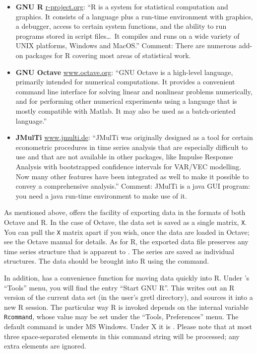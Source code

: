 \begin{itemize}

\item \textbf{GNU R} \href{http://www.r-project.org/}{r-project.org}:
  ``R is a system for statistical computation and graphics. It
  consists of a language plus a run-time environment with graphics, a
  debugger, access to certain system functions, and the ability to run
  programs stored in script files\dots\ It compiles and runs on a wide
  variety of UNIX platforms, Windows and MacOS.''  Comment: There are
  numerous add-on packages for R covering most areas of statistical
  work.

\item \textbf{GNU Octave}
  \href{http://www.octave.org/}{www.octave.org}:
  ``GNU Octave is a high-level language, primarily intended for
  numerical computations. It provides a convenient command line
  interface for solving linear and nonlinear problems numerically, and
  for performing other numerical experiments using a language that is
  mostly compatible with Matlab. It may also be used as a
  batch-oriented language.''

\item \textbf{JMulTi} \href{http://www.jmulti.de/}{www.jmulti.de}:
  ``JMulTi was originally designed as a tool for certain econometric
  procedures in time series analysis that are especially difficult to
  use and that are not available in other packages, like Impulse
  Response Analysis with bootstrapped confidence intervals for VAR/VEC
  modelling. Now many other features have been integrated as well to
  make it possible to convey a comprehensive analysis.''  Comment:
  JMulTi is a java GUI program: you need a java run-time environment to
  make use of it.

\end{itemize}

As mentioned above,  offers the facility of exporting
data in the formats of both Octave and R.  In the case of Octave, the
 data set is saved as a single matrix, \verb+X+. You can
pull the \verb+X+ matrix apart if you wish, once the data are loaded
in Octave; see the Octave manual for details.  As for R, the exported
data file preserves any time series structure that is apparent to
.  The series are saved as individual structures. The data
should be brought into R using the  command.
  
In addition,  has a convenience function for moving data
quickly into R.  Under 's ``Tools'' menu, you will find the
entry ``Start GNU R''.  This writes out an R version of the current
 data set (in the user's gretl directory), and sources it
into a new R session.  The particular way R is invoked depends on the
internal  variable \verb+Rcommand+, whose value may be set
under the ``Tools, Preferences'' menu.  The default command is
 under MS Windows. Under X it is .
Please note that at most three space-separated elements in this
command string will be processed; any extra elements are ignored.

